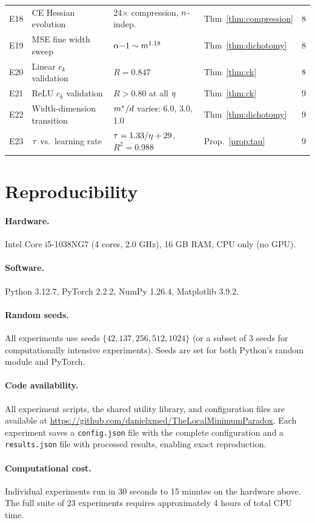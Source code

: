 \begin{table}[h!]
\begin{tabular}{@{}clllr@{}}
E18 & CE Hessian evolution & 24$\times$ compression, $n$-indep. & Thm~\ref{thm:compression} & 8 \\
E19 & MSE fine width sweep & $\alpha{-}1 \sim m^{1.18}$ & Thm~\ref{thm:dichotomy} & 8 \\
E20 & Linear $c_k$ validation & $R = 0.847$ & Thm~\ref{thm:ck} & 8 \\
E21 & ReLU $c_k$ validation & $R > 0.80$ at all $\eta$ & Thm~\ref{thm:ck} & 9 \\
E22 & Width-dimension transition & $m^*/d$ varies: 6.0, 3.0, 1.0 & Thm~\ref{thm:dichotomy} & 9 \\
E23 & $\tau$ vs.\ learning rate & $\tau = 1.33/\eta + 29$, $R^2 = 0.988$ & Prop.~\ref{prop:tau} & 9 \\
\bottomrule
\end{tabular}
\end{table}

\section{Reproducibility}
\label{app:reproducibility}

\paragraph{Hardware.} Intel Core i5-1038NG7 (4 cores, 2.0 GHz), 16 GB RAM, CPU only (no GPU).

\paragraph{Software.} Python 3.12.7, PyTorch 2.2.2, NumPy 1.26.4, Matplotlib 3.9.2.

\paragraph{Random seeds.} All experiments use seeds $\{42, 137, 256, 512, 1024\}$ (or a subset of 3 seeds for computationally intensive experiments). Seeds are set for both Python's random module and PyTorch.

\paragraph{Code availability.} All experiment scripts, the shared utility library, and configuration files are available at \url{https://github.com/danielxmed/TheLocalMinimumParadox}. Each experiment saves a \texttt{config.json} file with the complete configuration and a \texttt{results.json} file with processed results, enabling exact reproduction.

\paragraph{Computational cost.} Individual experiments run in 30 seconds to 15 minutes on the hardware above. The full suite of 23 experiments requires approximately 4 hours of total CPU time.
